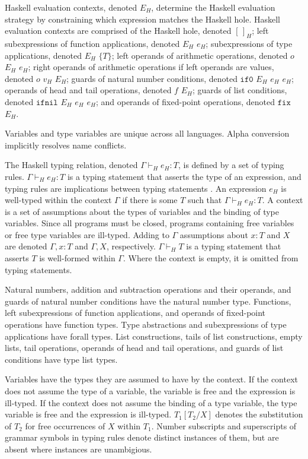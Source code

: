 Haskell evaluation contexts, denoted $E_{H}$, determine the Haskell evaluation strategy by constraining which expression matches the Haskell hole.  Haskell evaluation contexts are comprised of the Haskell hole, denoted $[\,]_{H}$; left subexpressions of function applications, denoted $E_{H}$ $e_{H}$; subexpressions of type applications, denoted $E_{H}$ $\lbrace T\rbrace$; left operands of arithmetic operations, denoted $o$ $E_{H}$ $e_{H}$; right operands of arithmetic operations if left operands are values, denoted $o$ $v_{H}$ $E_{H}$; guards of natural number conditions, denoted $\mathtt{if0}$ $E_{H}$ $e_{H}$ $e_{H}$; operands of head and tail operations, denoted $f$ $E_{H}$; guards of list conditions, denoted $\mathtt{ifnil}$ $E_{H}$ $e_{H}$ $e_{H}$; and operands of fixed-point operations, denoted $\mathtt{fix}$ $E_{H}$.

Variables and type variables are unique across all languages.  Alpha conversion implicitly resolves name conflicts.

The Haskell typing relation, denoted $\Gamma\vdash_{H}e_{H}:T$, is defined by a set of typing rules.  $\Gamma\vdash_{H}e_{H}:T$ is a typing statement that asserts the type of an expression, and typing rules are implications between typing statements \cite{pierce02}.  An expression $e_{H}$ is well-typed within the context $\Gamma$ if there is some $T$ such that $\Gamma\vdash_{H}e_{H}:T$.  A context is a set of assumptions about the types of variables and the binding of type variables.  Since all programs must be closed, programs containing free variables or free type variables are ill-typed.  Adding to $\Gamma$ assumptions about $x:T$ and $X$ are denoted $\Gamma,x:T$ and $\Gamma,X$, respectively.  $\Gamma\vdash_{H}T$ is a typing statement that asserts $T$ is well-formed within $\Gamma$.  Where the context is empty, it is omitted from typing statements.

Natural numbers, addition and subtraction operations and their operands, and guards of natural number conditions have the natural number type.  Functions, left subexpressions of function applications, and operands of fixed-point operations have function types.  Type abstractions and subexpressions of type applications have forall types.  List constructions, tails of list constructions, empty lists, tail operations, operands of head and tail operations, and guards of list conditions have type list types.

Variables have the types they are assumed to have by the context.  If the context does not assume the type of a variable, the variable is free and the expression is ill-typed.  If the context does not assume the binding of a type variable, the type variable is free and the expression is ill-typed.  $T_{1}[T_{2}/X]$ denotes the substitution of $T_{2}$ for free occurrences of $X$ within $T_{1}$.  Number subscripts and superscripts of grammar symbols in typing rules denote distinct instances of them, but are absent where instances are unambigious.

